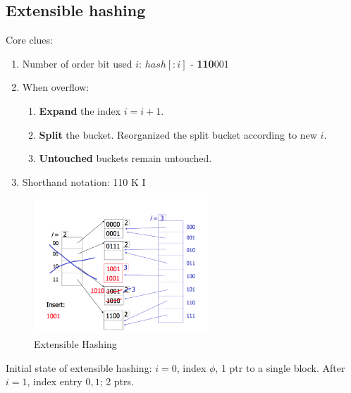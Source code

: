 \documentclass[a4paper]{report}
\begin{document}
\subsection{Extensible hashing}
Core clues:
\begin{enumerate}
\item Number of  order bit used $i$: $hash[:i]$ - \textbf{110}001
\item When overflow:
  \begin{enumerate}
  \item \textbf{Expand} the index $i=i+1$.
  \item \textbf{Split} the bucket. Reorganized the split bucket according to new $i$.
  \item \textbf{Untouched} buckets remain untouched. 
  \end{enumerate}
\item Shorthand notation: 110  K I
\end{enumerate}
\begin{figure}[H]
        \centerline{\includegraphics[height = 2in]{img/extensible_hashing}}
        \caption{Extensible Hashing}
    \label{fig:extensibleHashing}
\end{figure}
Initial state of extensible hashing: $i=0$, index $\phi$, 1 ptr to a single block. After $i=1$, index entry $0, 1$; 2 ptrs. 
\end{document}
